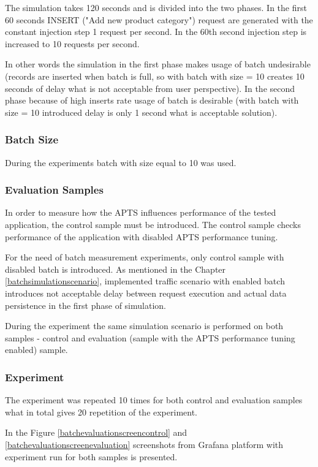 \documentclass[12pt,a4paper]{article}
\begin{document}
The simulation takes 120 seconds and is divided into the two phases. In the first 60 seconds INSERT ("Add new product category") request are generated with the constant injection step 1 request per second. In the 60th second injection step is increased to 10 requests per second. 

In other words the simulation in the first phase makes usage of batch undesirable (records are inserted when batch is full, so with batch with size = 10 creates 10 seconds of delay what is not acceptable from user perspective). In the second phase because of high inserts rate usage of batch is desirable (with batch with size = 10 introduced delay is only 1 second what is acceptable solution).  
 
\subsubsection{Batch Size} 
During the experiments batch with size equal to 10 was used. 


\subsubsection{Evaluation Samples} 

In order to measure how the APTS influences performance of the tested application, the control sample must be introduced. The control sample checks performance of the application with disabled APTS performance tuning. 

For the need of batch measurement experiments, only control sample with disabled batch is introduced. As mentioned in the Chapter \ref{batchsimulationscenario}, implemented traffic scenario with enabled batch introduces not acceptable delay between request execution and actual data persistence in the first phase of simulation. 

During the experiment the same simulation scenario is performed on both samples - control and evaluation (sample with the APTS performance tuning enabled) sample.

\subsubsection{Experiment} 

The experiment was repeated 10 times for both control and evaluation samples what in total gives 20 repetition of the experiment. 

In the Figure \ref{batchevaluationscreencontrol} and \ref{batchevaluationscreenevaluation} screenshots from Grafana platform with experiment run for both samples is presented. 
\end{document}
